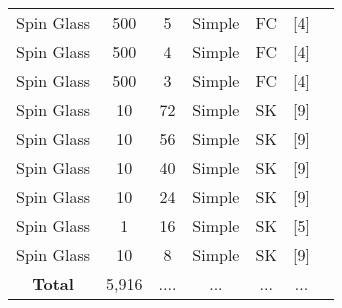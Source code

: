 \documentclass{standalone}
\begin{document}
\begin{tabular}{ |c|c|c|c|c|c|c| }
    Spin Glass & 500 & 5 & Simple & FC & [4] \\
    Spin Glass & 500 & 4 & Simple & FC & [4] \\
    Spin Glass & 500 & 3 & Simple & FC & [4] \\
    Spin Glass & 10 & 72 & Simple & SK & [9] \\
    Spin Glass & 10 & 56 & Simple & SK & [9] \\
    Spin Glass & 10 & 40 & Simple & SK & [9] \\
    Spin Glass & 10 & 24 & Simple & SK & [9] \\
    Spin Glass & 1 & 16 & Simple & SK & [5] \\
    Spin Glass & 10 & 8 & Simple & SK & [9] \\
    \hline
    \textbf{Total} & 5,916  & .... & ... & ... & ... \\
    \hline
\end{tabular}
\end{document}
